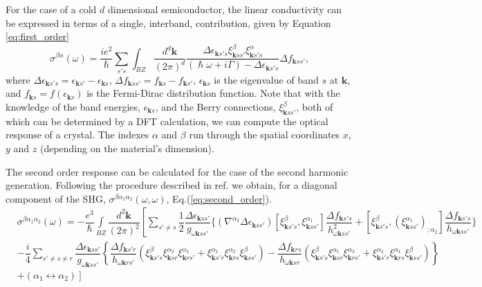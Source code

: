 \documentclass[a4paper,12pt]{report}
\begin{document}
For the case of a cold $d$ dimensional semiconductor, the linear conductivity can be expressed in terms of a single, interband, contribution,
 given by Equation \ref{eq:first_order}
\begin{equation}\label{eq:first_order}
 \sigma^{\beta\alpha}(\omega) = \frac{i e^2}{\hslash}\sum_{s's}\int_{BZ}\frac{d^d\pmb{k}}{(2\pi)^d}
 \frac{\Delta\epsilon_{\pmb{k}s's} \xi_{\pmb{k}ss'}^{\beta}\xi_{\pmb{k}s's}^{\alpha}}{(\hslash\omega + i\Gamma)
 - \Delta\epsilon_{\pmb{k}s's}}\Delta f_{\pmb{k}ss'},
\end{equation}
where $\Delta\epsilon_{\pmb{k}s's} = \epsilon_{\pmb{k}s'} - \epsilon_{\pmb{k}s}$,
 $\Delta f_{\pmb{k}ss'} = f_{\pmb{k}s} - f_{\pmb{k}s'}$,
 $\epsilon_{\pmb{k}s}$ is the eigenvalue of band $s$ at $\pmb{k}$, and $f_{\pmb{k}s}=f(\epsilon_{\pmb{k}s})$ is the
Fermi-Dirac distribution function.
Note that with the knowledge of the band energies, $\epsilon_{\pmb{k}s}$,
and the Berry connections, $\xi_{\pmb{k}ss'}^{\beta}$, both of which can be determined by a DFT calculation,
we can compute the optical response of a crystal.
The indexes $\alpha$ and $\beta$ run through the spatial coordinates $x$, $y$ and $z$ (depending on the material's dimension).

The second order response can be calculated for the case of the second harmonic generation.
Following the procedure described in ref. \cite{Ventura2017}
we obtain, for a diagonal component of the SHG, $\sigma^{\beta\alpha_1\alpha_2}(\omega,\omega)$, Eq.(\ref{eq:second_order}).
\begin{align}\label{eq:second_order}
 &\sigma^{\beta\alpha_1\alpha_2}(\omega) = -\dfrac{e^3}{\hslash}\int\limits_{BZ}\dfrac{d^2\pmb{k}}{(2\pi)^2}
 \left[
 \sum_{s'\ne s}\dfrac{1}{2} \dfrac{\Delta\epsilon_{\pmb{k}ss'} }{ g_{\omega\pmb{k}ss'}}
 \bigg\lbrace
 \left(\nabla^{\alpha_2} \Delta \epsilon_{\pmb{k}ss'} \right)
 \left[ \xi_{\pmb{k}s's}^{\beta},\xi_{\pmb{k}ss'}^{\alpha_1}\right]
 \dfrac{\Delta f_{\pmb{k}s's}}{  h_{\omega\pmb{k}ss'}^2 }
 + \left[ \xi_{\pmb{k}s's}^{\beta},(\xi_{\pmb{k}ss'}^{\alpha_1})_{;\alpha_2}\right]
 \dfrac{\Delta f_{\pmb{k}s's}}{  h_{\omega\pmb{k}ss'} }
 \bigg\rbrace
 \right.
 \\ \nonumber
 &-%
 \dfrac{i}{4}\sum_{s'\ne s \ne r}
 \dfrac{\Delta \epsilon_{\pmb{k}ss'} }{ g_{\omega\pmb{k}ss'} }
 \left\lbrace
   \dfrac{\Delta f_{\pmb{k}s'r}}{  h_{\omega\pmb{k}rs'} }
 \left( \xi_{\pmb{k}s's}^{\beta} \xi_{\pmb{k}sr}^{\alpha_2} \xi_{\pmb{k}rs'}^{\alpha_1}
     +  \xi_{\pmb{k}s'r}^{\alpha_1} \xi_{\pmb{k}rs}^{\alpha_2} \xi_{\pmb{k}ss'}^{\beta}\right)
 - \dfrac{\Delta f_{\pmb{k}rs }}{  h_{\omega\pmb{k}sr } }
 \left( \xi_{\pmb{k}s's}^{\beta} \xi_{\pmb{k}sr}^{\alpha_1} \xi_{\pmb{k}rs'}^{\alpha_2}
     +  \xi_{\pmb{k}s'r}^{\alpha_2} \xi_{\pmb{k}rs}^{\alpha_1} \xi_{\pmb{k}ss'}^{\beta}\right)
 \right\rbrace \\ \nonumber
 &\left. + \left( \alpha_1 \leftrightarrow \alpha_2\right)
 \right]
\end{align}
\end{document}
